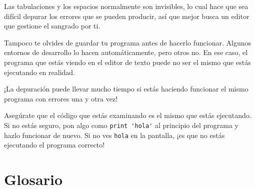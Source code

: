 
Las tabulaciones y los espacios normalmente son invisibles, lo cual hace
que sea difícil depurar los errores que se pueden producir, así que mejor
busca un editor que gestione el sangrado por ti.

Tampoco te olvides de guardar tu programa antes de hacerlo funcionar. Algunos
entornos de desarrollo lo hacen automáticamente, pero otros no.
En ese caso, el programa que estás viendo en el editor de texto
puede no ser el mismo que estás ejecutando en realidad.

¡La depuración puede llevar mucho tiempo si estás haciendo funcionar el
mismo programa con errores una y otra vez!

Asegúrate que el código que estás examinando es el mismo que estás ejecutando.
Si no estás seguro, pon algo como \verb"print 'hola'" al principio
del programa y hazlo funcionar de nuevo. Si no ves \verb"hola" en la
pantalla, ¡es que no estás ejecutando el programa correcto!


\section{Glosario}

